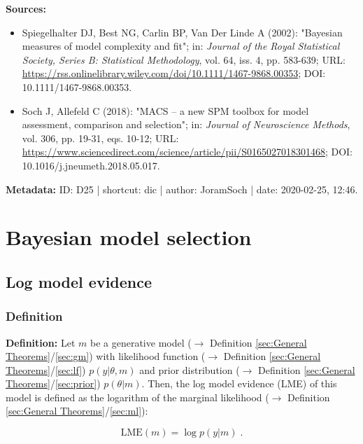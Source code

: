 \documentclass[a4paper,12pt,twoside]{book}
\begin{document}
\vspace{1em}
\textbf{Sources:}
\begin{itemize}
\item Spiegelhalter DJ, Best NG, Carlin BP, Van Der Linde A (2002): "Bayesian measures of model complexity and fit"; in: \textit{Journal of the Royal Statistical Society, Series B: Statistical Methodology}, vol. 64, iss. 4, pp. 583-639; URL: \url{https://rss.onlinelibrary.wiley.com/doi/10.1111/1467-9868.00353}; DOI: 10.1111/1467-9868.00353.
\item Soch J, Allefeld C (2018): "MACS – a new SPM toolbox for model assessment, comparison and selection"; in: \textit{Journal of Neuroscience Methods}, vol. 306, pp. 19-31, eqs. 10-12; URL: \url{https://www.sciencedirect.com/science/article/pii/S0165027018301468}; DOI: 10.1016/j.jneumeth.2018.05.017.
\end{itemize}


\vspace{1em}
\textbf{Metadata:} ID: D25 | shortcut: dic | author: JoramSoch | date: 2020-02-25, 12:46.
\vspace{1em}



\pagebreak
\section{Bayesian model selection}

\subsection{Log model evidence}

\subsubsection[\textit{Definition}]{Definition} \label{sec:lme}
\setcounter{equation}{0}

\textbf{Definition:} Let $m$ be a generative model ($\rightarrow$ Definition \ref{sec:General Theorems}/\ref{sec:gm}) with likelihood function ($\rightarrow$ Definition \ref{sec:General Theorems}/\ref{sec:lf}) $p(y \vert \theta, m)$ and prior distribution ($\rightarrow$ Definition \ref{sec:General Theorems}/\ref{sec:prior}) $p(\theta \vert m)$. Then, the log model evidence (LME) of this model is defined as the logarithm of the marginal likelihood ($\rightarrow$ Definition \ref{sec:General Theorems}/\ref{sec:ml}):

\begin{equation} \label{eq:lme-LME}
\mathrm{LME}(m) = \log p(y|m) \; .
\end{equation}
\end{document}
